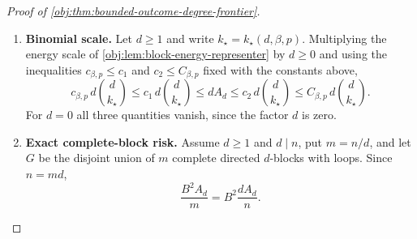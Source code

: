 \documentclass[11pt]{article}
\begin{document}
\begin{proof}[Proof of \cref{obj:thm:bounded-outcome-degree-frontier}]
\begin{enumerate}
\item \textbf{Binomial scale.}
Let \(d\ge1\) and write \(k_\star=k_\star(d,\beta,p)\).  Multiplying the energy
scale of \cref{obj:lem:block-energy-representer} by \(d\ge0\) and using the inequalities
\(c_{\beta,p}\le c_1\) and \(c_2\le C_{\beta,p}\) fixed with the constants above,
\[
c_{\beta,p}\,d\binom{d}{k_\star}
\le
c_1\,d\binom{d}{k_\star}
\le
dA_d
\le
c_2\,d\binom{d}{k_\star}
\le
C_{\beta,p}\,d\binom{d}{k_\star}.
\]
For \(d=0\) all three quantities vanish, since the factor \(d\) is zero.

\item \textbf{Exact complete-block risk.}
Assume \(d\ge1\) and \(d\mid n\), put \(m=n/d\), and let \(G\) be the disjoint
union of \(m\) complete directed \(d\)-blocks with loops.  Since \(n=md\),
\[
\frac{B^2A_d}{m}=B^2\frac{dA_d}{n}.
\]


\end{enumerate}
\end{proof}
\end{document}
